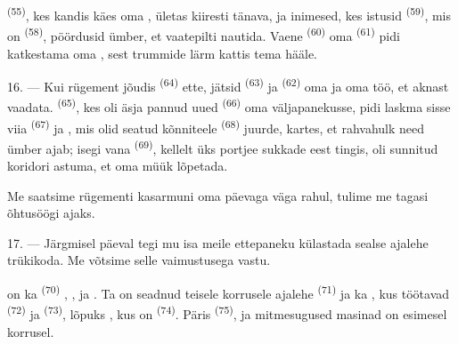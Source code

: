 \VUsaut{3.0mm}

 \textsuperscript{(55)}, kes kandis käes oma
, ületas kiiresti tänava, ja inimesed, kes istusid
 \textsuperscript{(59)}, mis on 
\textsuperscript{(58)}, pöördusid ümber, et vaatepilti nautida. Vaene 
\textsuperscript{(60)} oma  \textsuperscript{(61)} pidi katkestama oma
, sest trummide lärm kattis tema hääle.

16. --- Kui rügement jõudis  \textsuperscript{(64)} ette, jätsid
 \textsuperscript{(63)} ja  \textsuperscript{(62)} oma
 ja oma töö, et aknast vaadata. 
\textsuperscript{(65)}, kes oli äsja pannud uued 
\textsuperscript{(66)} oma väljapanekusse, pidi laskma sisse viia 
\textsuperscript{(67)} ja , mis olid seatud kõnniteele
 \textsuperscript{(68)} juurde, kartes, et rahvahulk need
ümber ajab; isegi vana  \textsuperscript{(69)}, kellelt üks portjee
sukkade eest tingis, oli sunnitud koridori astuma, et oma müük lõpetada.

Me saatsime rügementi kasarmuni  oma päevaga väga rahul, tulime me tagasi
õhtusöögi ajaks.

\VUsaut{3.0mm}

17. --- Järgmisel päeval tegi mu isa meile ettepaneku külastada sealse ajalehe
trükikoda. Me võtsime selle vaimustusega vastu.

 on ka  \textsuperscript{(70)}
, ,  ja
. Ta on seadnud teisele korrusele ajalehe 
\textsuperscript{(71)} ja ka , kus töötavad 
\textsuperscript{(72)} ja  \textsuperscript{(73)}, lõpuks
, kus on  \textsuperscript{(74)}. Päris
 \textsuperscript{(75)},  ja mitmesugused masinad
on esimesel korrusel.

\VUsaut{3.0mm}

